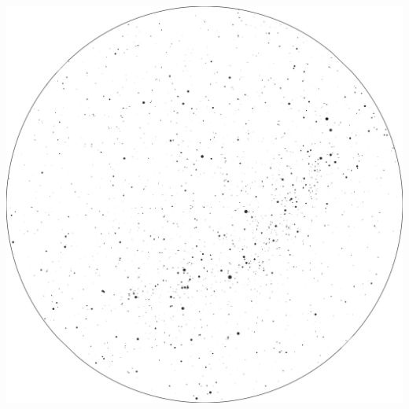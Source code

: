 \documentclass{./SAS-class-skygen}
\begin{document}
	\vspace{0.5cm}
    \begin{center}
    \includegraphics[width=\textwidth]{./pics/skychart20.png}
    \end{center}
    
    
\end{document}
